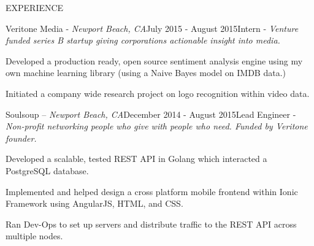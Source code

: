 \documentclass{resume} %
\begin{document}
 
 
\begin{rSection}{EXPERIENCE}



    \begin{rSubsection}{Veritone Media - {\it Newport Beach, CA}}{July 2015 - August 2015}{Intern - {\sl Venture funded series B startup giving corporations actionable insight into media.}}

\item Developed a production ready, open source sentiment analysis engine using my own machine learning library (using a Naive Bayes model on IMDB data.)
\item Initiated a company wide research project on logo recognition within video data.
\end{rSubsection}

\begin{rSubsection}{Soulsoup – {\it Newport Beach, CA}}{December 2014 - August 2015}{Lead Engineer - {\sl Non-profit networking people who give with people who need. Funded by Veritone founder.}}

\item Developed a scalable, tested REST API in Golang which interacted a PostgreSQL database.
\item Implemented and helped design a cross platform mobile frontend within Ionic Framework using AngularJS, HTML, and CSS.
\item Ran Dev-Ops to set up servers and distribute traffic to the REST API across multiple nodes.
\end{rSubsection} 

\end{rSection}

\end{document}
